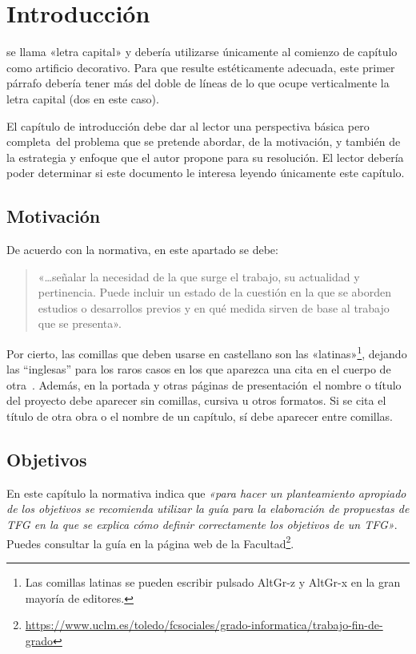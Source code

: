 \chapter{Introducción}

 se llama «letra capital» y debería utilizarse únicamente al comienzo de capítulo como artificio decorativo. Para que resulte estéticamente adecuada, este primer párrafo debería tener más del doble de líneas de lo que ocupe verticalmente la letra capital (dos en este caso).

El capítulo de introducción debe dar al lector una perspectiva básica \textemdash pero completa\textemdash~del problema que se pretende abordar, de la motivación, y también de la estrategia y enfoque que el autor propone para su resolución. El lector debería poder determinar si este documento le interesa leyendo únicamente este capítulo.

\section{Motivación}

De acuerdo con la normativa, en este apartado se debe:

\begin{quote}
  «\dots señalar la necesidad de la que surge el trabajo, su actualidad y pertinencia. Puede incluir un estado de la cuestión en la que se aborden estudios o desarrollos previos y en qué medida sirven de base al trabajo que se presenta».
\end{quote}

Por cierto, las comillas que deben usarse en castellano son las «latinas»\footnote{Las comillas latinas se pueden escribir pulsado AltGr-z y AltGr-x en la gran mayoría de editores.}, dejando las ``inglesas'' para los raros casos en los que aparezca una cita en el cuerpo de otra~\cite{sousa}. Además, en la portada \textemdash y otras páginas de presentación\textemdash~el nombre o título del proyecto debe aparecer sin comillas, cursiva u otros formatos. Si se cita el título de otra obra o el nombre de un capítulo, sí debe aparecer entre comillas.

\section{Objetivos}

\noindent  %
En este capítulo la normativa indica que \emph{«para hacer un planteamiento apropiado de los objetivos se recomienda utilizar la guía para la elaboración de propuestas de \acf{TFG} en la que se explica cómo definir correctamente los objetivos de un \ac{TFG}»}. Puedes consultar la guía en la página web de la Facultad\footnote{\url{https://www.uclm.es/toledo/fcsociales/grado-informatica/trabajo-fin-de-grado}}.


